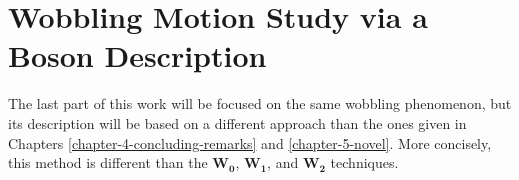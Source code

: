 \chapter{Wobbling Motion Study via a Boson Description}
\label{extra-chapter-new-boson}

The last part of this work will be focused on the same wobbling phenomenon, but its description will be based on a different approach than the ones given in Chapters \ref{chapter-4-concluding-remarks} and \ref{chapter-5-novel}. More concisely, this method is different than the $\mathbf{W_0}$, $\mathbf{W_1}$, and $\mathbf{W_2}$ techniques.  